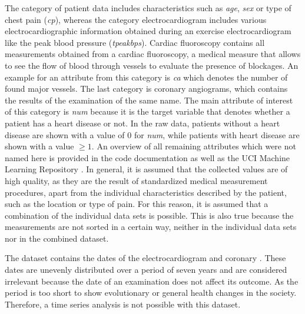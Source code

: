The category of patient data includes characteristics such as \textit{age}, \textit{sex} or type of chest pain (\textit{cp}), whereas the category electrocardiogram includes various electrocardiographic information obtained during an exercise electrocardiogram like the peak blood pressure (\textit{tpeakbps}). Cardiac fluoroscopy contains all measurements obtained from a cardiac fluoroscopy, a medical measure that allows to see the flow of blood through vessels to evaluate the presence of blockages. An example for an attribute from this category is \textit{ca} which denotes the number of found major vessels. The last category is coronary angiograms, which contains the results of the examination of the same name. The main attribute of interest of this category is \textit{num} because it is the target variable that denotes whether a patient has a heart disease or not. In the raw data, patients without a heart disease are shown with a value of 0 for \textit{num}, while patients with heart disease are shown with a value  $\geq 1$.
An overview of all remaining attributes which were not named here is provided in the code documentation as well as the UCI Machine Learning Repository \citep{janosi1988}. In general, it is assumed that the collected values are of high quality, as they are the result of standardized medical measurement procedures, apart from the individual characteristics described by the patient, such as the location or type of pain. For this reason, it is assumed that a combination of the individual data sets is possible. This is also true because the measurements are not sorted in a certain way, neither in the individual data sets nor in the combined dataset.

The dataset contains the dates of the electrocardiogram and coronary . These dates are unevenly distributed over a period of seven years and are considered irrelevant because the date of an examination does not affect its outcome. As the period is too short to show evolutionary or general health changes in the society. Therefore, a time series analysis is not possible with this dataset.

